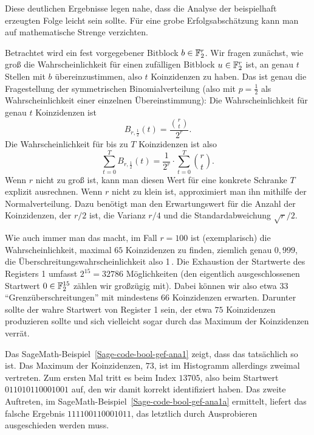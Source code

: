\begin{refsegment}
Diese deutlichen Ergebnisse legen nahe, dass die Analyse der beispielhaft
erzeugten Folge leicht sein sollte. Für eine grobe Erfolgsabschätzung
kann man auf mathematische Strenge verzichten.

Betrachtet wird ein fest vorgegebener Bitblock $b \in \mathbb{F}_2^r$. Wir fragen
zunächst, wie groß die Wahrscheinlichkeit für einen zufälligen Bitblock
$u \in \mathbb{F}_2^r$ ist, an genau $t$ Stellen mit $b$ übereinzustimmen,
also $t$ Koinzidenzen zu haben. Das ist genau die Fragestellung der
symmetrischen Binomialverteilung
(also mit $p = \frac{1}{2}$ als
Wahrscheinlichkeit einer einzelnen Übereinstimmung): Die
Wahrscheinlichkeit für genau $t$ Koinzidenzen ist
\[
     B_{r,\frac{1}{2}}(t)  =  \frac{\binom{r}{t}}{2^r}.
\]
Die Wahrscheinlichkeit für bis zu $T$ Koinzidenzen ist also
\[
     \sum_{t=0}^T B_{r,\frac{1}{2}}(t)
       =  \frac{1}{2^r} \cdot \sum_{t=0}^T \binom{r}{t}.
\]
Wenn $r$ nicht zu groß ist, kann man diesen Wert für eine konkrete
Schranke $T$ explizit ausrechnen. Wenn $r$ nicht zu klein ist,
approximiert man ihn mithilfe der Normalverteilung.
Dazu benötigt man den Erwartungswert für die
Anzahl der Koinzidenzen, der $r/2$ ist, die Varianz $r/4$ und die
Standardabweichung $\sqrt{r}/2$.

Wie auch immer man das macht, im Fall $r = 100$ ist (exemplarisch) die
Wahrscheinlichkeit, maximal $65$ Koinzidenzen zu finden, ziemlich
genau $0,999$, die Überschreitungswahrscheinlichkeit also
1\,\textperthousand{}. Die Exhaustion der Startwerte des Registers 1
umfasst $2^{15} = 32786$ Möglichkeiten (den eigentlich ausgeschlossenen
Startwert $0 \in \mathbb{F}_2^{15}$ zählen wir großzügig mit). Dabei
können wir also etwa $33$ "`Grenzüberschreitungen"' mit mindestens
66 Koinzidenzen erwarten. Darunter sollte der wahre Startwert
von Register 1 sein,
der etwa $75$ Koinzidenzen produzieren sollte und sich vielleicht
sogar durch das Maximum der Koinzidenzen verrät.

Das SageMath-Beispiel~\ref{Sage-code-bool-gef-ana1} zeigt, dass das
tatsächlich so ist. Das Maximum der Koinzidenzen, $73$, ist im
Histogramm allerdings zweimal vertreten. Zum ersten Mal tritt
es beim Index $13705$, also beim Startwert $011010110001001$
auf, den wir damit korrekt identifiziert haben. Das zweite
Auftreten, im SageMath-Beispiel~\ref{Sage-code-bool-gef-ana1a}
ermittelt, liefert das falsche Ergebnis $111100110001011$, das
letztlich durch Ausprobieren ausgeschieden werden muss.

\begin{sagecode}
\begin{verbatim}


\end{verbatim}
\end{sagecode}
\end{refsegment}
